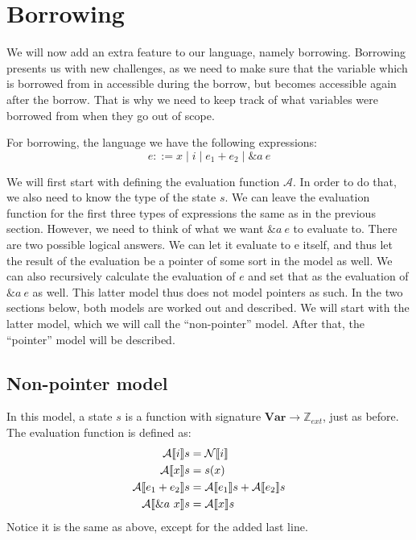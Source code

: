 \section{Borrowing}
We will now add an extra feature to our language, namely borrowing. Borrowing presents us with new challenges, as we need to make sure that the variable which is borrowed from in accessible during the borrow, but becomes accessible again after the borrow. That is why we need to keep track of what variables were borrowed from when they go out of scope. 

For borrowing, the language we have the following expressions: 
$$e ::= x \mid i \mid e_1 + e_2 \mid \&a~e$$

We will first start with defining the evaluation function $\mathcal{A}$. In order to do that, we also need to know the type of the state $s$. We can leave the evaluation function for the first three types of expressions the same as in the previous section. However, we need to think of what we want $\&a~e$ to evaluate to. There are two possible logical answers. We can let it evaluate to e itself, and thus let the result of the evaluation be a pointer of some sort in the model as well. We can also recursively calculate the evaluation of $e$ and set that as the evaluation of $\&a~e$ as well. This latter model thus does not model pointers as such. In the two sections below, both models are worked out and described. We will start with the latter model, which we will call the ``non-pointer'' model. After that, the ``pointer'' model will be described. 

\subsection{Non-pointer model}
In this model, a state $s$ is a function with signature $\textbf{Var} \to \mathbb{Z}_{ext}$, just as before. The evaluation function is defined as:
\begin{align*}
    \mathcal{A} \llbracket i \rrbracket s          &= \mathcal{N} \llbracket i \rrbracket
\\  \mathcal{A} \llbracket x \rrbracket s          &= s(x)
\\  \mathcal{A} \llbracket e_1 + e_2 \rrbracket s  &= \mathcal{A} \llbracket e_1 \rrbracket s + \mathcal{A} \llbracket e_2 \rrbracket s
\\ \mathcal{A} \llbracket \&a~x \rrbracket s       &= \mathcal{A} \llbracket x \rrbracket s
\end{align*}
Notice it is the same as above, except for the added last line. 

